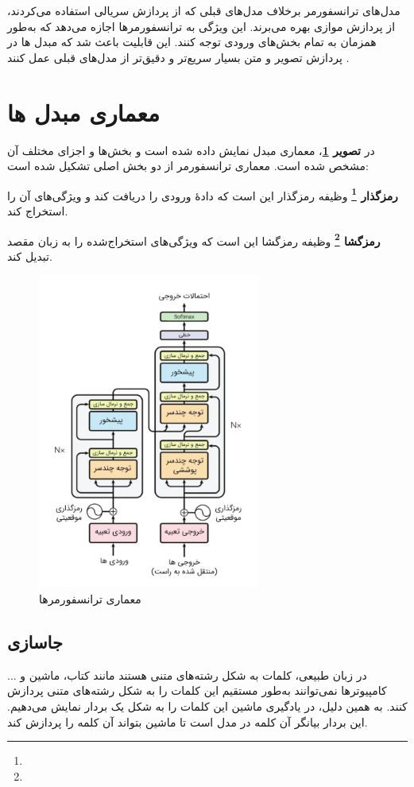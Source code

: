 مدل‌های ترانسفورمر برخلاف مدل‌های قبلی که از پردازش سریالی استفاده می‌کردند، از پردازش موازی بهره می‌برند. این ویژگی به ترانسفورمرها اجازه می‌دهد که به‌طور همزمان به تمام بخش‌های ورودی توجه کنند. این قابلیت باعث شد که مبدل ها در پردازش تصویر و متن بسیار سریع‌تر و دقیق‌تر از مدل‌های قبلی عمل کنند \cite{vaswani2017attention}.

\section{معماری مبدل ها}
در \textbf{تصویر \ref{fig:transformer_architecture}}، معماری مبدل نمایش داده شده است و بخش‌ها و اجزای مختلف آن مشخص شده است. معماری ترانسفورمر از دو بخش اصلی تشکیل شده است:

\textbf{رمزگذار \footnote{}}
وظیفه رمزگذار این است که دادهٔ ورودی را دریافت کند و ویژگی‌های آن را استخراج کند.

	

\textbf{رمزگشا \footnote{}}
وظیفه رمزگشا این است که ویژگی‌های استخراج‌شده را به زبان مقصد تبدیل کند.


\begin{figure}[h]
	\centering
	\includegraphics[width=0.65\textwidth]{transformer_images/persian images/b04.png}
	\caption{معماری ترانسفورمرها}
	\label{fig:transformer_architecture}
\end{figure}

\subsection{جاسازی}
در زبان طبیعی، کلمات به شکل رشته‌های متنی هستند مانند کتاب، ماشین و ... کامپیوترها نمی‌توانند به‌طور مستقیم این کلمات را به شکل رشته‌های متنی پردازش کنند. به همین دلیل، در یادگیری ماشین این کلمات را به شکل یک بردار نمایش می‌دهیم. این بردار بیانگر آن کلمه در مدل است تا ماشین بتواند آن کلمه را پردازش کند.

